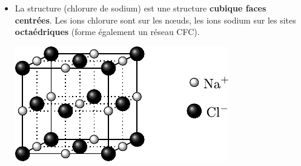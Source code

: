 \documentclass[../../main/main.tex]{subfiles}
\begin{document}
\begin{itemize}
	\item
	      \noindent
	      \begin{minipage}[t]{.65\linewidth}
		      La structure  (chlorure de sodium) est une structure
		      \textbf{cubique faces centrées}. Les ions chlorure sont sur les nœuds, les ions
		      sodium sur les sites \textbf{octaédriques} (forme également un réseau CFC).
	      \end{minipage}
	      \hfill
	      \begin{minipage}[t]{.30\linewidth}
		      \vspace{-20pt}
		      \includegraphics[width=.8\linewidth]{nacl}
	      \end{minipage}


\end{itemize}
\end{document}
